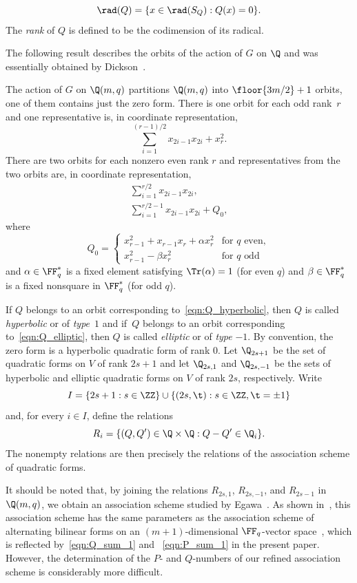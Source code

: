 \[
\rad(Q)=\{x\in \rad(S_Q):Q(x)=0\}.
\]
The \emph{rank} of $Q$ is defined to be the codimension of its radical.
\par
The following result describes the orbits of the action of $G$ on $\Q$ and was essentially obtained by Dickson~\cite{Dic1958}.
\begin{prop}
\label{pro:canonical_quad_forms}
The action of $G$ on $\Q(m,q)$ partitions $\Q(m,q)$ into $\floor{3m/2}+1$ orbits, one of them contains just the zero form. There is one orbit for each odd rank~$r$ and one representative is, in coordinate representation, 
\[
\sum_{i=1}^{(r-1)/2}x_{2i-1}x_{2i}+x_r^2.
\]
There are two orbits for each nonzero even rank $r$ and representatives from the two orbits are, in coordinate representation,
\begin{gather}
\sum_{i=1}^{r/2}x_{2i-1}x_{2i},   \label{eqn:Q_hyperbolic}\\
\sum_{i=1}^{r/2-1}x_{2i-1}x_{2i}+Q_0,   \label{eqn:Q_elliptic}
\end{gather}
where
\[
Q_0=\begin{cases}
x_{r-1}^2+x_{r-1}x_r+\alpha x_r^2  & \text{for $q$ even},\\
x_{r-1}^2-\beta x_r^2              & \text{for $q$ odd}
\end{cases}
\]
and $\alpha\in\FF_q^*$ is a fixed element satisfying $\Tr(\alpha)=1$ (for even $q$) and $\beta\in\FF_q^*$ is a fixed nonsquare in $\FF_q^*$ (for odd $q$). 
\end{prop}
\par
{}
If $Q$ belongs to an orbit corresponding to~\eqref{eqn:Q_hyperbolic}, then $Q$ is called \emph{hyperbolic} or of \emph{type}~$1$ and if~$Q$ belongs to an orbit corresponding to~\eqref{eqn:Q_elliptic}, then $Q$ is called \emph{elliptic} or of \emph{type} $-1$. By convention, the zero form is a hyperbolic quadratic form of rank $0$. Let $\Q_{2s+1}$ be the set of quadratic forms on $V$ of rank ${2s+1}$ and let $\Q_{2s,1}$ and $\Q_{2s,-1}$ be the sets of hyperbolic and elliptic quadratic forms on $V$ of rank $2s$, respectively. Write
\[
I=\left\{2s+1:s\in\ZZ\right\}\cup \left\{(2s,\t):s\in\ZZ,\t=\pm 1\right\}
\]
and, for every $i\in I$, define the relations 
\begin{equation}
R_i=\{(Q,Q')\in\Q\times \Q:Q-Q'\in \Q_i\}.   \label{eqn:relations_Q}
\end{equation}
The nonempty relations are then precisely the relations of the association scheme of quadratic forms. 
\par
It should be noted that, by joining the relations $R_{2s,1}$, $R_{2s,-1}$, and $R_{2s-1}$ in $\Q(m,q)$, we obtain an association scheme studied by Egawa~\cite{Ega1985}. As shown in~\cite{Ega1985}, this association scheme has the same parameters as the association scheme of alternating bilinear forms on an $(m+1)$-dimensional $\FF_q$-vector space~\cite{DelGoe1975}, which is reflected by~\eqref{eqn:Q_sum_1} and ~\eqref{eqn:P_sum_1} in the present paper. However, the determination of the $P$- and $Q$-numbers of our refined association scheme is considerably more difficult.
